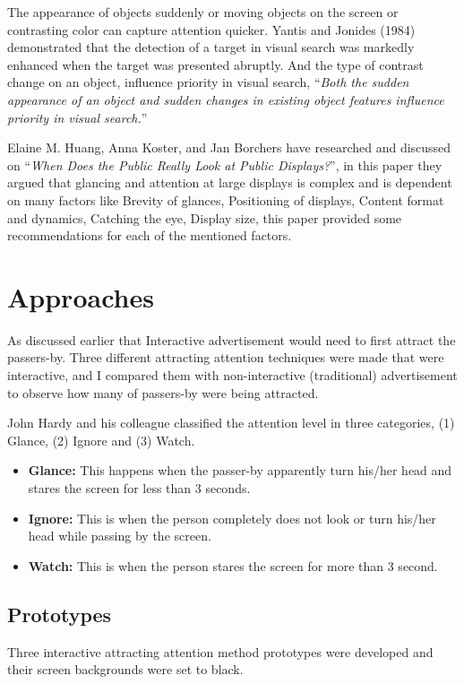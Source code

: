 The appearance of objects suddenly or moving objects on the screen or contrasting color can capture attention quicker. Yantis and Jonides (1984) demonstrated that the detection of a target in visual search was markedly enhanced when the target was presented abruptly\cite{capturingattention}. And the type of contrast change on an object, influence priority in visual search, ``\emph{Both the sudden appearance of an object and sudden changes in existing object features influence priority in visual search.}''\cite{Luminance}

Elaine M. Huang, Anna Koster, and Jan Borchers have researched and discussed on ``\emph{When Does the Public Really Look at Public Displays?}''\cite{WhenPublicDisplays}, in this paper they argued that glancing and attention at large displays is complex and is dependent on many factors like Brevity of glances, Positioning of displays, Content format and dynamics, Catching the eye, Display size, this paper provided some recommendations for each of the mentioned factors.

\section{Approaches}
As discussed earlier that Interactive advertisement would need to first attract the passers-by. Three different attracting attention techniques were made that were interactive, and I compared them with non-interactive (traditional) advertisement to observe how many of passers-by were being attracted.

John Hardy and his colleague \cite{glancingcount} classified the attention level in three categories, (1) Glance, (2) Ignore and (3) Watch. 

\begin{itemize}
\item \textbf{Glance: } This happens when the passer-by apparently turn his/her head and stares the screen for less than 3 seconds.
\item \textbf{Ignore: } This is when the person completely does not look or turn his/her head while passing by the screen.
\item \textbf{Watch: } This is when the person stares the screen for more than 3 second.
\end{itemize}


\subsection{Prototypes}
Three interactive attracting attention method prototypes were developed and their screen backgrounds were set to black.
 
